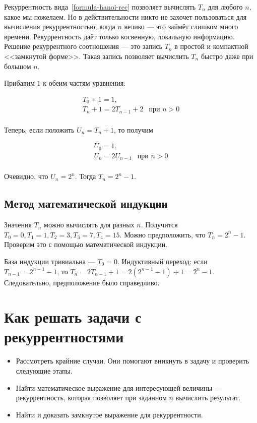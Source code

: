 Рекуррентность вида~\ref{formula-hanoi-rec} позволяет вычислять $T_n$ для любого $n$, какое мы пожелаем. Но в действительности
никто не захочет пользоваться для вычисления рекуррентностью, когда $n$ велико --- это займёт
слишком много времени. Рекуррентность даёт только косвенную, локальную информацию.
Решение рекуррентного соотношения --- это запись $T_n$ в простой и компактной
<<замкнутой форме>>. Такая запись позволяет вычислить $T_n$ быстро даже при большом $n$.

Прибавим $1$ к обеим частям уравнения:

\begin{equation}
\begin{array}{ll}
T_0 + 1 = 1, \\
T_n + 1 = 2T_{n-1} + 2 & \text{при } n > 0 \\
\end{array}
\end{equation}

Теперь, если положить $U_n = T_n + 1$, то получим 

\begin{equation}
\begin{array}{ll}
U_0 = 1, \\
U_n = 2U_{n-1} & \text{при } n > 0 \\
\end{array}
\end{equation}

Очевидно, что $U_n = 2^n$. Тогда $T_n = 2^n - 1$.


\subsection{Метод математической индукции}

Значения $T_n$ можно вычислять для разных $n$. Получится $T_0=0, T_1=1, T_2=3, T_3=7, T_4=15$.
Можно предположить, что $T_n=2^n-1$. Проверим это с помощью математической индукции.

База индукции тривиальна --- $T_0 = 0$. Индуктивный переход: если $T_{n-1}=2^{n-1}-1$, то
$T_n = 2T_{n-1}+1 = 2(2^{n-1}-1)+1 = 2^n - 1$. Следовательно, предположение было справедливо.

\section{Как решать задачи с рекуррентностями}

\begin{itemize}
\item Рассмотреть крайние случаи. Они помогают вникнуть в задачу и проверить
      следующие этапы.
\item Найти математическое выражение для интересующей величины ---
      рекуррентность, которая позволяет при заданном $n$ вычислить результат.
\item Найти и доказать замкнутое выражение для рекуррентности.
\end{itemize}

